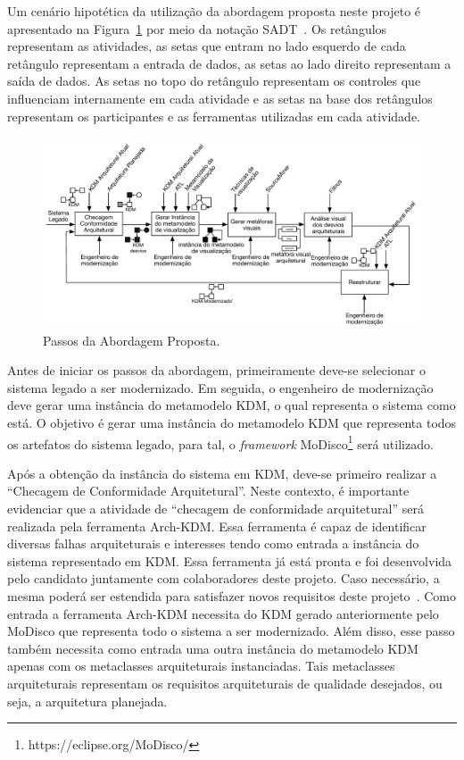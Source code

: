 \documentclass[12pt]{article}
\begin{document}
Um cenário hipotética da utilização da abordagem proposta neste projeto é apresentado na Figura~\ref{fig:approach_steps} por meio da notação SADT~\cite{Marcaraf}. Os retângulos representam as atividades, as setas que entram no lado esquerdo de cada retângulo representam a entrada de dados, as setas ao lado direito representam a saída de dados. As setas no topo do retângulo representam os controles que influenciam internamente em cada atividade e as setas na base dos retângulos representam os participantes e as ferramentas utilizadas em cada atividade.

\begin{figure}[htb]
 \label{fig:approach_steps}
 \centering
 \includegraphics[scale=0.6]{projeto_pos_doc_figura4.pdf}
 \caption{Passos da Abordagem Proposta.}
\end{figure}

Antes de iniciar os passos da abordagem, primeiramente deve-se selecionar o sistema legado a ser modernizado. Em seguida, o engenheiro de modernização deve gerar uma instância do metamodelo KDM, o qual representa o sistema como está. O objetivo é gerar uma instância do metamodelo KDM que representa todos os artefatos do sistema legado, para tal, o \textit{framework} MoDisco\footnote{https://eclipse.org/MoDisco/} será utilizado.

Após a obtenção da instância do sistema em KDM, deve-se primeiro realizar a ``Checagem de Conformidade Arquitetural''. Neste contexto, é importante evidenciar que a atividade de ``checagem de conformidade arquitetural'' será realizada pela ferramenta Arch-KDM. Essa ferramenta é capaz de identificar diversas falhas arquiteturais e interesses tendo como entrada a instância do sistema representado em KDM. Essa ferramenta já está pronta e foi desenvolvida pelo candidato juntamente com colaboradores deste projeto. Caso necessário, a mesma poderá ser estendida para satisfazer novos requisitos deste projeto~\cite{source_miner_glauco, daniel_san_journal}. Como entrada a ferramenta Arch-KDM necessita do KDM gerado anteriormente pelo MoDisco que representa todo o sistema a ser modernizado. Além disso, esse passo também necessita como entrada uma outra instância do metamodelo KDM apenas com os metaclasses arquiteturais instanciadas. Tais metaclasses arquiteturais representam os requisitos arquiteturais de qualidade desejados, ou seja, a arquitetura planejada.  
\end{document}

